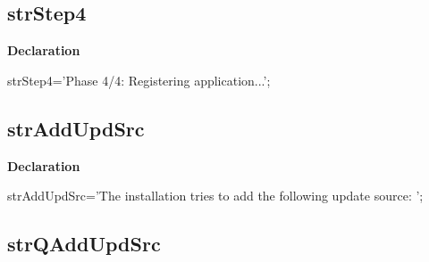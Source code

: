 \documentclass{report}
\newif\ifpdf
\begin{document}
\subsection*{strStep4}
\fi
\label{trstrings-strStep4}
\begin{list}{}{
\setlength{\itemindent}{0cm}
\setlength{\listparindent}{0cm}
\setlength{\leftmargin}{\evensidemargin}
\addtolength{\leftmargin}{\tmplength}
\settowidth{\labelsep}{X}
\addtolength{\leftmargin}{\labelsep}
\setlength{\labelwidth}{\tmplength}
}
\item[\textbf{Declaration}\hfill]
\ifpdf
\begin{flushleft}
\fi
\begin{ttfamily}
strStep4='Phase 4/4: Registering application...';\end{ttfamily}

\ifpdf
\end{flushleft}
\fi

\end{list}
\ifpdf
\subsection*{\large{\textbf{strAddUpdSrc}}\normalsize\hspace{1ex}\hrulefill}
\else
\subsection*{strAddUpdSrc}
\fi
\label{trstrings-strAddUpdSrc}
\begin{list}{}{
\setlength{\itemindent}{0cm}
\setlength{\listparindent}{0cm}
\setlength{\leftmargin}{\evensidemargin}
\addtolength{\leftmargin}{\tmplength}
\settowidth{\labelsep}{X}
\addtolength{\leftmargin}{\labelsep}
\setlength{\labelwidth}{\tmplength}
}
\item[\textbf{Declaration}\hfill]
\ifpdf
\begin{flushleft}
\fi
\begin{ttfamily}
strAddUpdSrc='The installation tries to add the following update source: ';\end{ttfamily}

\ifpdf
\end{flushleft}
\fi

\end{list}
\ifpdf
\subsection*{\large{\textbf{strQAddUpdSrc}}\normalsize\hspace{1ex}\hrulefill}
\else
\end{document}
